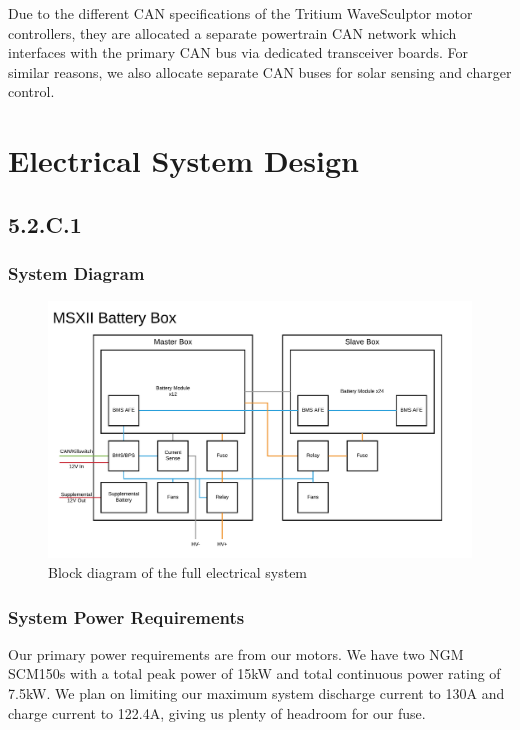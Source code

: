 \documentclass[10pt]{article}
\begin{document}
Due to the different CAN specifications of the Tritium WaveSculptor motor controllers, they are allocated a separate powertrain CAN network which interfaces with the primary CAN bus via dedicated transceiver boards. For similar reasons, we also allocate separate CAN buses for solar sensing and charger control.

\section{Electrical System Design}

\subsection{5.2.C.1}

\subsubsection{System Diagram}

\begin{figure}[H]
    \centering
    \includegraphics[width=\textwidth,page=3]{figures/msxii-block-diagrams}
    \caption{Block diagram of the full electrical system}
    \label{fig:msxii-electrical-full-block-diagram}
\end{figure}

\subsubsection{System Power Requirements}

Our primary power requirements are from our motors. We have two NGM SCM150s with a total peak power of 15kW and total continuous power rating of 7.5kW. We plan on limiting our maximum system discharge current to 130A and charge current to 122.4A, giving us plenty of headroom for our fuse.
\end{document}
